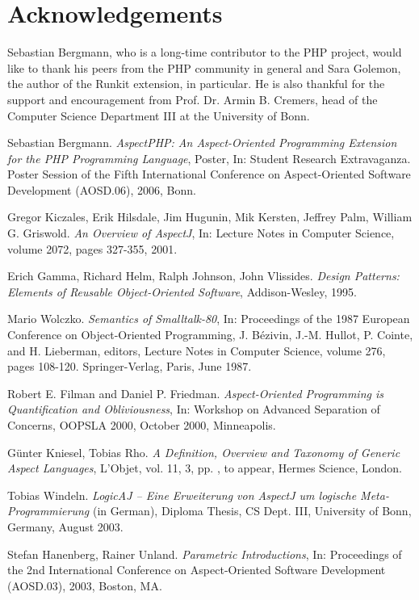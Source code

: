 \documentclass{acm_proc_article-sp}
\begin{document}
\section{Acknowledgements}
Sebastian Bergmann, who is a long-time contributor to the PHP
project, would like to thank his peers from the PHP community in
general and Sara Golemon, the author of the Runkit extension, in
particular. He is also thankful for the support and encouragement
from Prof. Dr. Armin B. Cremers, head of the Computer Science
Department III at the University of Bonn.


\begin{thebibliography}{}

Sebastian Bergmann. \emph{AspectPHP: An Aspect-Oriented Programming Extension for the PHP Programming Language},
Poster, In: Student Research Extravaganza. Poster Session of the Fifth International Conference on Aspect-Oriented Software Development (AOSD.06), 2006, Bonn.

Gregor Kiczales, Erik Hilsdale, Jim Hugunin, Mik Kersten, Jeffrey Palm, William G. Griswold. \emph{An Overview of AspectJ}, In: Lecture Notes in Computer Science, volume 2072, pages 327-355, 2001.

Erich Gamma, Richard Helm, Ralph Johnson, John Vlissides. \emph{Design Patterns: Elements of Reusable Object-Oriented Software}, Addison-Wesley, 1995.

Mario Wolczko. \emph{Semantics of Smalltalk-80}, In: Proceedings of the 1987 European Conference on Object-Oriented Programming, J. B\'ezivin, J.-M. Hullot, P. Cointe, and H. Lieberman, editors, Lecture Notes in Computer Science, volume 276, pages 108-120. Springer-Verlag, Paris, June 1987.

Robert E. Filman and Daniel P. Friedman. \emph{Aspect-Oriented Programming is Quantification and Obliviousness}, In: Workshop on Advanced Separation of Concerns, OOPSLA 2000, October 2000, Minneapolis.

G{\"u}nter Kniesel, Tobias Rho. \emph{A Definition, Overview and Taxonomy of Generic Aspect Languages}, L'Objet, vol. 11, 3, pp. , to appear, Hermes Science, London.

Tobias Windeln. \emph{LogicAJ -- Eine Erweiterung von AspectJ um logische Meta-Programmierung} (in German), Diploma Thesis, CS Dept. III, University of Bonn, Germany, August 2003.

Stefan Hanenberg, Rainer Unland. \emph{Parametric Introductions}, In: Proceedings of the 2nd International Conference on Aspect-Oriented Software Development (AOSD.03), 2003, Boston, MA.


\end{thebibliography}
\end{document}
